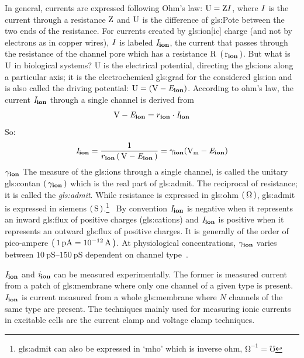 \documentclass[class={myRUCProject}, crop=false]{standalone}
\begin{document}
In general, currents are expressed following Ohm's law: \(\mathrm{U}=\mathrm{Z}\mathit{I}\), where \(\mathit{I}\) is the current through a resistance \(\mathrm{Z}\) and \(\mathrm{U}\) is the difference of \gls{gls:Pote} between the two ends of the resistance. 
For currents created by \gls{gls:ion}[ic] charge (and not by electrons as in copper wires), \(\mathit{I}\) is labeled \(\mathit{I}_\mathbf{ion}\), the current that passes through the resistance of the channel pore which has a resistance \(\mathrm{R}\) \(\left(\,\mathrm{r}_\mathbf{ion}\,\right)\). 
%
But what is \(\mathrm{U}\) in biological systems? 
%
\unit{U} is the electrical potential, directing the \glspl{gls:ion} along a particular axis; it is the electrochemical \gls{gls:grad} for the considered \gls{gls:ion} and is also called the driving potential: \(\rmm{U}=(\unit{\V} - \equi\ion)\). According to ohm's law, the current \(\mathit{I}_\mathbf{ion}\) through a single channel is derived from 
\begin{equation}
  \unit{\V} - \equi\ion = r\ion \cdot \curr\ion
\end{equation}
So:
\begin{equation}\label{eq:cur2con}
  \curr\ion= \frac{1}{r\ion\br{\unit{\V} - \equi\ion}} = \ucon\ion(\unit{\V\membrane} - \equi\ion)
\end{equation}
\(\gamma_\mathbf{ion}\) The measure of the \glspl{gls:ion} through a single channel, is called the unitary \gls{gls:contan} \(\left(\,\gamma_\mathbf{ion}\,\right)\) which is the real part of \gls{gls:admit}. 
The reciprocal of resistance; it is called the \textit{\gls{gls:admit}}.
While resistance is expressed in \gls{gls:ohm} \(\br{\unit{\ohm}}\), \gls{gls:admit} is expressed in siemens \(\br{\unit{\siemens}}\).\footnote{\Gls{gls:admit} can also be expressed in `mho' which is inverse ohm, \(\unit{\ohm}^{-1} = \unit{\mho}\)}~
By convention \(\mathit{I}_\mathbf{ion}\) is negative when it represents an inward \gls{gls:flux} of positive charges (\glspl{gls:cation}) and \(\mathit{I}_\mathbf{ion}\) is positive when it represents an outward \gls{gls:flux} of positive charges. It is generally of the order of pico-ampere \(\br{\qty{1}{\pico\ampere}=\qty{e-12}{\ampere}}\). At physiological concentrations, \(\gamma_\mathbf{ion}\) varies between \(\qtyrange{10}{150}{\pico\siemens}\) dependent on channel type~\cite{Hammond2015ch4}.

\(\mathit{I}_\mathbf{ion}\) and \(\mathit{i}_\mathbf{ion}\) can be measured experimentally. 
The former is measured current from a patch of \gls{gls:membrane} where only one channel of a given type is present.
{}\(\mathit{I}_\mathbf{ion}\) is current measured from a whole \gls{gls:membrane} where \(N\) channels of the same type are present. The techniques mainly used for measuring ionic currents in excitable cells are the current clamp and voltage clamp techniques.
\end{document}
